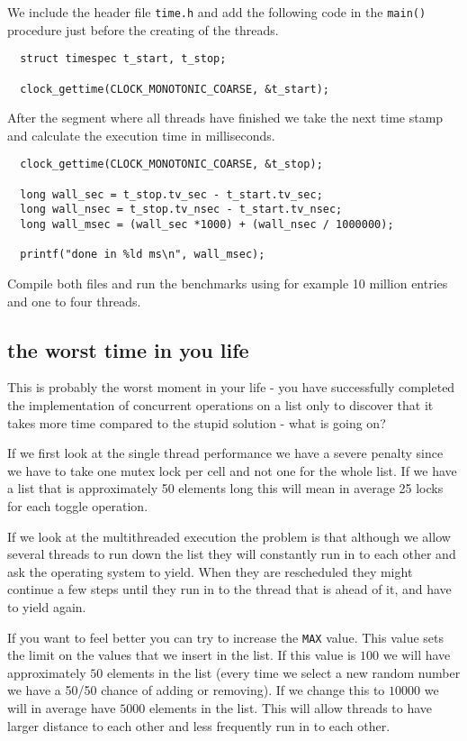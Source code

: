 \documentclass[a4paper,11pt]{article}
\begin{document}
We include the header file {\tt time.h} and add the following code in
the {\tt main()} procedure just before the creating of the threads.

\begin{lstlisting}
  struct timespec t_start, t_stop;

  clock_gettime(CLOCK_MONOTONIC_COARSE, &t_start);
\end{lstlisting}

After the segment where all threads have finished we take the next
time stamp and calculate the execution time in milliseconds.

\begin{lstlisting}
  clock_gettime(CLOCK_MONOTONIC_COARSE, &t_stop);

  long wall_sec = t_stop.tv_sec - t_start.tv_sec;
  long wall_nsec = t_stop.tv_nsec - t_start.tv_nsec;
  long wall_msec = (wall_sec *1000) + (wall_nsec / 1000000);
  
  printf("done in %ld ms\n", wall_msec);
\end{lstlisting}

Compile both files and run the benchmarks using for example 10 million
entries and one to four threads.

\subsection{the worst time in you life}

This is probably the worst moment in your life - you have successfully
completed the implementation of concurrent operations on a list only
to discover that it takes more time compared to the stupid
solution - what is going on?

If we first look at the single thread performance we have a severe
penalty since we have to take one mutex lock per cell and not one for
the whole list. If we have a list that is approximately 50 elements
long this will mean in average 25 locks for each toggle operation.

If we look at the multithreaded execution the problem is that
although we allow several threads to run down the list they will
constantly run in to each other and ask the operating system to
yield. When they are rescheduled they might continue a few steps until
they run in to the thread that is ahead of it, and have to yield again.

If you want to feel better you can try to increase the {\tt MAX}
value. This value sets the limit on the values that we insert in the
list. If this value is $100$ we will have approximately $50$ elements
in the list (every time we select a new random number we have a 50/50
chance of adding or removing). If we change this to $10000$ we will
in average have $5000$ elements in the list. This will allow threads
to have larger distance to each other and less frequently run in to
each other. 
\end{document}
